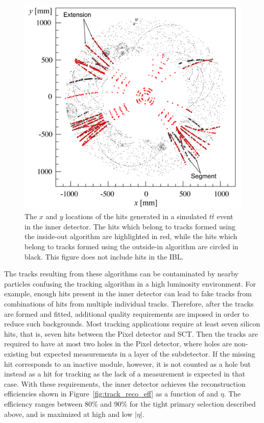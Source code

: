 \begin{figure}
\includegraphics[width=\fullfig]{figures/track_patterns.png}
\caption{The $x$ and $y$ locations of the hits generated in a simulated $t\bar{t}$ event in the inner detector. The hits which belong to tracks formed using the inside-out algorithm are highlighted in red, while the hits which belong to tracks formed using the outside-in algorithm are circled in black. This figure does not include hits in the \ac{IBL}.}
\label{fig:track_patterns}
\end{figure}

The tracks resulting from these algorithms can be contaminated by nearby particles confusing the tracking algorithm in a high luminosity environment.
For example, enough hits present in the inner detector can lead to fake tracks from combinations of hits from multiple individual tracks.
Therefore, after the tracks are formed and fitted, additional quality requirements are imposed in order to reduce such backgrounds.
Most tracking applications require at least seven silicon hits, that is, seven hits between the Pixel detector and \ac{SCT}.
Then the tracks are required to have at most two holes in the Pixel detector, where holes are non-existing but expected measurements in a layer of the subdetector.
If the missing hit corresponds to an inactive module, however, it is not counted as a hole but instead as a hit for tracking as the lack of a measurement is expected in that case.
With these requirements, the inner detector achieves the reconstruction efficiencies shown in Figure~\ref{fig:track_reco_eff} as a function of \pt and $\eta$.
The efficiency ranges between 80\% and 90\% for the tight primary selection described above, and is maximized at high \pt and low $|\eta|$.

